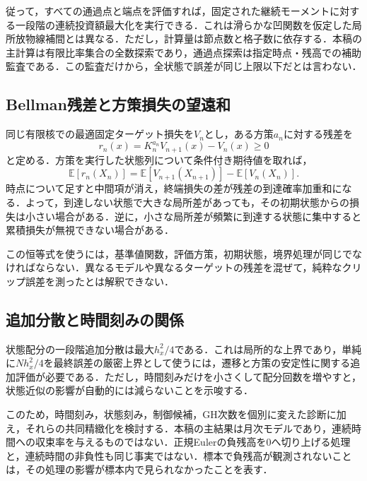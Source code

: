 \documentclass[11pt,a4paper]{article}
\numberwithin{equation}{section}
\numberwithin{table}{section}
\numberwithin{figure}{section}
\theoremstyle{plain}
\theoremstyle{definition}
\newcommand{\E}{\mathbb{E}}
\begin{document}
従って，すべての通過点と端点を評価すれば，固定された継続モーメントに対する一段階の連続投資額最大化を実行できる．これは滑らかな凹関数を仮定した局所放物線補間とは異なる．ただし，計算量は節点数と格子数に依存する．本稿の主計算は有限比率集合の全数探索であり，通過点探索は指定時点・残高での補助監査である．この監査だけから，全状態で誤差が同じ上限以下だとは言わない．

\subsection{Bellman残差と方策損失の望遠和}
同じ有限核での最適固定ターゲット損失を$V_n$とし，ある方策$a_n$に対する残差を
\begin{equation}
r_n(x)=K_n^{a_n}V_{n+1}(x)-V_n(x)\geq0
\end{equation}
と定める．方策を実行した状態列について条件付き期待値を取れば，
\begin{equation}
\E[r_n(X_n)]=\E[V_{n+1}(X_{n+1})]-\E[V_n(X_n)].
\end{equation}
時点について足すと中間項が消え，終端損失の差が残差の到達確率加重和になる．よって，到達しない状態で大きな局所差があっても，その初期状態からの損失は小さい場合がある．逆に，小さな局所差が頻繁に到達する状態に集中すると累積損失が無視できない場合がある．

この恒等式を使うには，基準値関数，評価方策，初期状態，境界処理が同じでなければならない．異なるモデルや異なるターゲットの残差を混ぜて，純粋なクリップ誤差を測ったとは解釈できない．

\subsection{追加分散と時間刻みの関係}
状態配分の一段階追加分散は最大$h_x^2/4$である．これは局所的な上界であり，単純に$Nh_x^2/4$を最終誤差の厳密上界として使うには，遷移と方策の安定性に関する追加評価が必要である．ただし，時間刻みだけを小さくして配分回数を増やすと，状態近似の影響が自動的には減らないことを示唆する．

このため，時間刻み，状態刻み，制御候補，GH次数を個別に変えた診断に加え，それらの共同精緻化を検討する．本稿の主結果は月次モデルであり，連続時間への収束率を与えるものではない．正規Eulerの負残高を0へ切り上げる処理と，連続時間の非負性も同じ事実ではない．標本で負残高が観測されないことは，その処理の影響が標本内で見られなかったことを表す．
\end{document}
